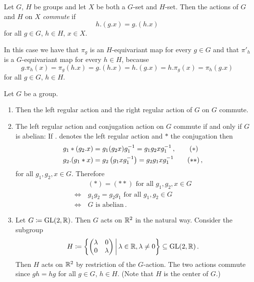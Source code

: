 \begin{definition}
  Let $G$, $H$ be groups and let $X$ be both a $G$-set and $H$-set.
  Then the actions of $G$ and $H$ on $X$ \emph{commute} if
  \[
      h.(g.x)
    = g.(h.x)
  \]
  for all $g \in G$, $h \in H$, $x \in X$.
\end{definition}


\begin{remark}
  In this case we have that $\pi_g$ is an $H$-equivariant map for every $g \in G$ and that $\pi'_h$ is a $G$-equivariant map for every $h \in H$, because
  \[
      g.\pi_h(x)
    = \pi_g(h.x)
    = g.(h.x)
    = h.(g.x)
    = h.\pi_g(x)
    = \pi_h(g.x)
  \]
  for all $g \in G$, $h \in H$.
\end{remark}


\begin{example}
  Let $G$ be a group.
  \begin{enumerate}[label=\alph*),leftmargin=*]
    \item
      Then the left regular action and the right regular action of $G$ on $G$ commute.
    \item
      The left regular action and conjugation action on $G$ commute if and only if $G$ is abelian:
      If $.$ denotes the left regular action and $*$ the conjugation then
      \begin{align*}
            g_1*(g_2.x)
        &=  g_1 (g_2 x) g_1^{-1}
         =  g_1 g_2 x g_1^{-1} \,,
        \tag{\ensuremath{\ast}}
        \\
            g_2.(g_1*x)
        &=  g_2 \left(g_1 x g_1^{-1}\right)
         =  g_2 g_1 x g_1^{-1}
        \tag{\ensuremath{\ast\ast}} \,,
      \end{align*}
      for all $g_1, g_2, x \in G$.
      Therefore
      \begin{align*}
            &\, \text{$(\ast) = (\ast\ast)$ for all $g_1, g_2, x \in G$}  \\
        \iff&\, \text{$g_1 g_2 = g_2 g_1$ for all $g_1, g_2 \in G$}       \\
        \iff&\, \text{$G$ is abelian} \,.
      \end{align*}
    \item
      Let $G \coloneqq \operatorname{GL}(2,\mathbb{R})$.
      Then $G$ acts on $\mathbb{R}^2$ in the natural way.
      Consider the subgroup
      \[
                  H
        \coloneqq \left\{
                    \begin{pmatrix}
                      \lambda & 0       \\
                      0       & \lambda
                    \end{pmatrix}
                  \suchthat*
                    \lambda \in \Real,
                    \lambda \neq 0
                  \right\}
        \subseteq \GL(2,\Real) \,.
      \]
      Then $H$ acts on $\mathbb{R}^2$ by restriction of the $G$-action.
      The two actions commute since $gh = hg$ for all $g \in G$, $h \in H$.
      (Note that $H$ is the center of $G$.)
  \end{enumerate}
\end{example}





